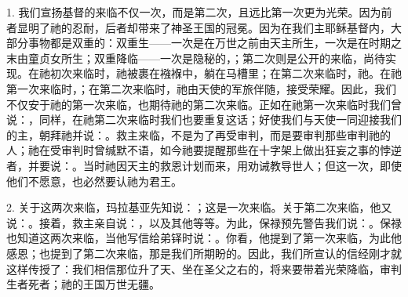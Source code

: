 1. 我们宣扬基督的来临不仅一次，而是第二次，且远比第一次更为光荣。因为前者显明了祂的忍耐，后者却带来了神圣王国的冠冕。因为在我们主耶稣基督内，大部分事物都是双重的：双重生——一次是在万世之前由天主所生，一次是在时期之末由童贞女所生；双重降临——一次是隐秘的，；第二次则是公开的来临，尚待实现。在祂初次来临时，祂被裹在襁褓中，躺在马槽里；在第二次来临时，祂。在祂第一次来临时，；在第二次来临时，祂由天使的军旅伴随，接受荣耀。因此，我们不仅安于祂的第一次来临，也期待祂的第二次来临。正如在祂第一次来临时我们曾说：，同样，在祂第二次来临时我们也要重复这话；好使我们与天使一同迎接我们的主，朝拜祂并说：。救主来临，不是为了再受审判，而是要审判那些审判祂的人；祂在受审判时曾缄默不语，如今祂要提醒那些在十字架上做出狂妄之事的悖逆者，并要说：。当时祂因天主的救恩计划而来，用劝诫教导世人；但这一次，即使他们不愿意，也必然要认祂为君王。\par

2. 关于这两次来临，玛拉基亚先知说：；这是一次来临。关于第二次来临，他又说：。接着，救主亲自说：，以及其他等等。为此，保禄预先警告我们说：。保禄也知道这两次来临，当他写信给弟铎时说：。你看，他提到了第一次来临，为此他感恩；也提到了第二次来临，那是我们所期盼的。因此，我们所宣认的信经刚才就这样传授了：我们相信那位升了天、坐在圣父之右的，将来要带着光荣降临，审判生者死者；祂的王国万世无疆。\par

